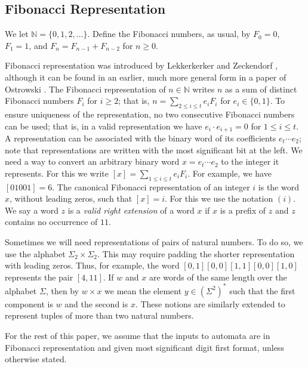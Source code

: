 \documentclass[12pt,reqno]{article}
\def\Enn{\mathbb{N}}
\begin{document}
\subsection{Fibonacci Representation} \label{subsection:fib-rep}

We let $\Enn = \{0,1,2,\ldots \}$.
Define the Fibonacci numbers, as usual, by
$F_0 = 0$, $F_1 = 1$, and $F_n = F_{n-1} + F_{n-2}$ for $n \geq 0$.

Fibonacci representation was introduced by
Lekkerkerker \cite{lekkerkerker_voorstelling_1951} and
Zeckendorf \cite{zeckendorf_representation_1972}, although it
can be found 
in an earlier, much more general form in a paper of Ostrowski \cite{ostrowski_bemerkungen_1922}.
The Fibonacci representation of $n \in \Enn$ writes $n$ 
as a sum of distinct Fibonacci numbers $F_i$ for $i \geq 2$; that is,
$n = \sum_{2 \leq i \leq t} e_i F_{i}$ for $e_i \in \{0,1\}$.
To ensure uniqueness of the representation, no two
consecutive Fibonacci numbers can be used; that is, in a valid representation we have
$e_i  \cdot e_{i+1} = 0$ for $1 \leq i \leq t$.  A representation can
be associated with the binary word of its coefficients
$e_t  \cdots e_2$;
note that representations are written with the most significant bit
at the left.  We need a way to convert an arbitrary
binary word $x = e_t \cdots e_2$ to the integer it
represents. For this we write $[x] = \sum_{1 \leq i \leq t} e_i F_{i}$.
For example, we have $[01001] = 6$.
The canonical Fibonacci representation of an integer $i$ is the word $x$, without leading zeros, such that $[x] = i$.  For this we use
the notation $(i)$.
We say a word $z$ is a {\it valid right extension\/} of a word $x$
if $x$ is a prefix of $z$ and $z$ contains no occurrence of $11$.

Sometimes we will need representations of pairs of natural
numbers.  To do so, we use the alphabet $\Sigma_2 \times \Sigma_2$.
This may require padding the shorter representation with leading zeros.
Thus, for example, the word
$[0,1][0,0][1,1][0,0][1,0]$ represents the pair $[4,11]$.
If $w$ and $x$ are words of the same length over the
alphabet $\Sigma$, then by $w \times x$ we mean
the element $y \in (\Sigma^2)^*$ such that
the first component is $w$ and the second is $x$. These notions are similarly extended to represent tuples of more than two natural numbers.

For the rest of this paper, we assume that the inputs to automata are in Fibonacci representation and given most significant digit first format, unless otherwise stated.
\end{document}
